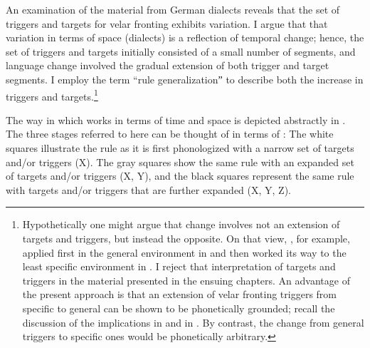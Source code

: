\begin{xlist}
\begin{xlist}
An examination of the material from German dialects reveals that the set of triggers and targets for velar fronting exhibits variation. I argue that that variation in terms of space (dialects) is a reflection of temporal change; hence, the set of triggers and targets initially consisted of a small number of segments, and language change involved the gradual extension of both trigger and target segments. I employ the term “rule generalizationˮ to describe both the increase in triggers and targets.\footnote{Hypothetically one might argue that change involves not an extension of targets and triggers, but instead the opposite. On that view, , for example, applied first in the general environment in  and then worked its way to the least specific environment in . I reject that interpretation of targets and triggers in the material presented in the ensuing chapters. An advantage of the present approach is that an extension of velar fronting triggers from specific to general can be shown to be phonetically grounded; recall the discussion of the implications in  and  in . By contrast, the change from general triggers to specific ones would be phonetically arbitrary.}

The way in which  works in terms of time and space is depicted abstractly in . The three stages referred to here can be thought of in terms of : The white squares illustrate the rule as it is first phonologized with a narrow set of targets and/or triggers (X). The gray squares show the same rule with an expanded set of targets and/or triggers (X, Y), and the black squares represent the same rule with targets and/or triggers that are further expanded (X, Y, Z).



\end{xlist}
\end{xlist}
